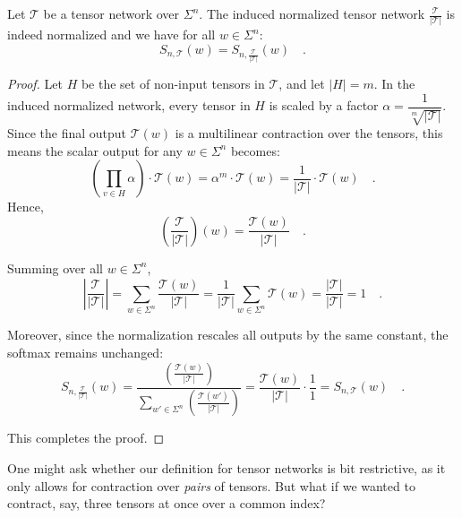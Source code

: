 \documentclass[../../main.tex]{subfiles}
\begin{document}
    \begin{lemma}
        Let $\mathcal{T}$ be a tensor network over $\Sigma^n$. The induced normalized tensor network $\frac{\mathcal{T}}{|\mathcal{T}|}$ is indeed normalized and we have for all $w \in \Sigma^n$:
        \[
            S_{n, \mathcal{T}}(w) = S_{n, \frac{\mathcal{T}}{|\mathcal{T}|}}(w) \quad .
        \]
    \end{lemma}
    \begin{proof}
        Let $H$ be the set of non-input tensors in $\mathcal{T}$, and let $|H| = m$. In the induced normalized network, every tensor in $H$ is scaled by a factor $\alpha = \dfrac{1}{\sqrt[m]{|\mathcal{T}|}}$. Since the final output $\mathcal{T}(w)$ is a multilinear contraction over the tensors, this means the scalar output for any $w \in \Sigma^n$ becomes:
        \[
            \left( \prod_{v \in H} \alpha \right) \cdot \mathcal{T}(w) = \alpha^m \cdot \mathcal{T}(w) = \frac{1}{|\mathcal{T}|} \cdot \mathcal{T}(w) \quad .
        \]
        Hence,
        \[
            \left(\frac{\mathcal{T}}{|\mathcal{T}|}\right)(w) = \frac{\mathcal{T}(w)}{|\mathcal{T}|} \quad .
        \]

        Summing over all \( w \in \Sigma^n \),
        \[
            \left| \frac{\mathcal{T}}{|\mathcal{T}|} \right| = \sum_{w \in \Sigma^n} \frac{\mathcal{T}(w)}{|\mathcal{T}|} = \frac{1}{|\mathcal{T}|} \sum_{w \in \Sigma^n} \mathcal{T}(w) = \frac{|\mathcal{T}|}{|\mathcal{T}|} = 1 \quad .
        \]

        Moreover, since the normalization rescales all outputs by the same constant, the softmax remains unchanged:
        \[
            S_{n, \frac{\mathcal{T}}{|\mathcal{T}|}}(w) = \frac{\left( \frac{\mathcal{T}(w)}{|\mathcal{T}|} \right)}{\sum_{w' \in \Sigma^n} \left( \frac{\mathcal{T}(w')}{|\mathcal{T}|} \right)} = \frac{\mathcal{T}(w)}{|\mathcal{T}|} \cdot \frac{1}{1} = S_{n, \mathcal{T}}(w) \quad .
        \]

        This completes the proof.
    \end{proof}



    One might ask whether our definition for tensor networks is bit restrictive, as it only allows for contraction over \emph{pairs} of tensors. But what if we wanted to contract, say, three tensors at once over a common index?
\end{document}
